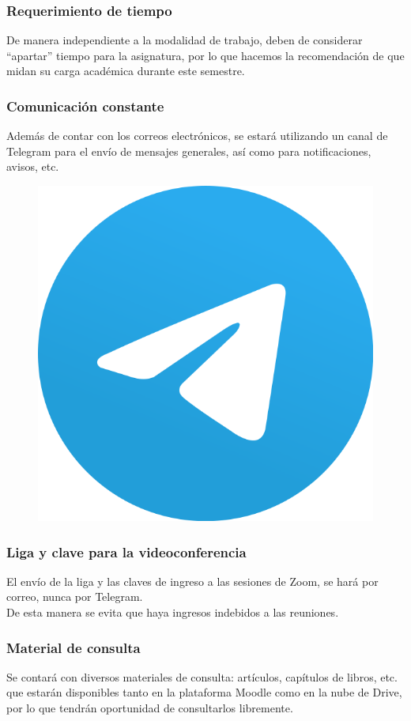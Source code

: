 \documentclass[12pt]{beamer}
\begin{document}
\begin{frame}
\frametitle{Requerimiento de tiempo}
De manera independiente a la modalidad de trabajo, deben de considerar \enquote{apartar} tiempo para la asignatura, por lo que hacemos la recomendación de que midan su carga académica durante este semestre.
\end{frame}
\begin{frame}
\frametitle{Comunicación constante}
Además de contar con los correos electrónicos, se estará utilizando un canal de Telegram para el envío de mensajes generales, así como para notificaciones, avisos, etc.
\\
\bigskip
\begin{figure}
    \centering
    \includegraphics[scale=0.15]{Imagenes/Logo_Telegram.png}
\end{figure}
\end{frame}
\begin{frame}
\frametitle{Liga y clave para la videoconferencia}
El envío de la liga y las claves de ingreso a las sesiones de Zoom, se hará por correo, nunca por Telegram.
\\
\bigskip
De esta manera se evita que haya ingresos indebidos a las reuniones.
\end{frame}
\begin{frame}
\frametitle{Material de consulta}
Se contará con diversos materiales de consulta: artículos, capítulos de libros, etc. que estarán disponibles tanto en la plataforma Moodle como en la nube de Drive, por lo que tendrán oportunidad de consultarlos libremente.
\end{frame}
\end{document}
